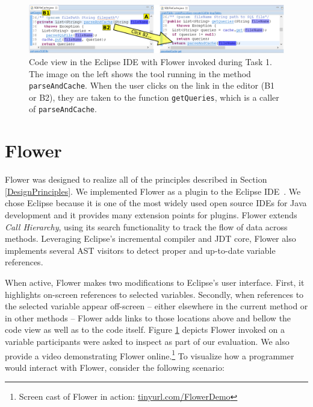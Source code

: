 \documentclass[conference]{IEEEtran}
\begin{document}
\begin{figure}
	\includegraphics[width=\textwidth]{images/toolScreenshot}
	\caption{Code view in the Eclipse IDE with Flower invoked during Task 1. The image on the left shows the tool running in the method \texttt{parseAndCache}. When the user clicks on the link in the editor (B1 or B2), they are taken to the function \texttt{getQueries}, which is a caller of \texttt{parseAndCache}.}	
	\label{fig:tool} 
\end{figure}

\section{Flower}
Flower was designed to realize all of the principles described in Section \ref{DesignPrinciples}. 
We implemented Flower as a plugin to the Eclipse IDE~\cite{Eclipse}. 
We chose Eclipse because it is one of the most widely used open source IDEs for Java development and it provides many extension points for plugins. 
Flower extends \emph{Call Hierarchy}, using its search functionality to track the flow of data across methods. 
Leveraging Eclipse's incremental compiler and JDT core, Flower also implements several AST visitors to detect proper and up-to-date variable references.

When active, Flower makes two modifications to Eclipse's user interface. 
First, it highlights on-screen references to selected variables.
Secondly, when references to the selected variable appear off-screen -- either elsewhere in the current method or in other methods -- Flower adds links to those locations above and bellow the code view as well as to the code itself. 
Figure \ref{fig:tool} depicts Flower invoked on a variable participants were asked to inspect as part of our evaluation. We also provide a video demonstrating Flower online.\footnote{Screen cast of Flower in action: \url{tinyurl.com/FlowerDemo}} To visualize how a programmer would interact with Flower, consider the following scenario:
\end{document}
